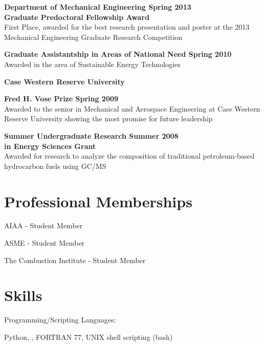 \begin{outerlist}
   \item \textbf{Department of Mechanical Engineering \hfill Spring 2013\\
                 Graduate Predoctoral Fellowship Award}\\
          First Place, awarded for the best research presentation and poster at the 2013 Mechanical Engineering Graduate Research Competition
   \item \textbf{Graduate Assistantship in Areas of National Need \hfill Spring 2010}\\
          Awarded in the area of Sustainable Energy Technologies
\end{outerlist}

\vspace{0.1in}

\textbf{\large Case Western Reserve University}

\begin{outerlist}
   \item \textbf{Fred H. Vose Prize \hfill Spring 2009}\\
                 Awarded to the senior in Mechanical and Aerospace Engineering at Case Western Reserve University showing the most promise for future leadership

   \item \textbf{Summer Undergraduate Research \hfill Summer 2008\\
                 in Energy Sciences Grant}\\
                 Awarded for research to analyze the composition of traditional petroleum-based hydrocarbon fuels using GC/MS
\end{outerlist}

\section{Professional Memberships}
AIAA - Student Member

ASME - Student Member

The Combustion Institute - Student Member


\section{Skills}
Programming/Scripting Languages:
%
\begin{innerlist}
    \item Python, \Matlab, FORTRAN 77, UNIX shell scripting (bash)
\end{innerlist}

